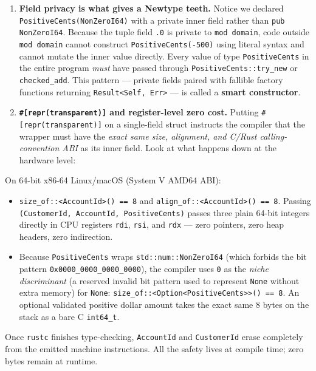 \begin{enumerate}
  \item \textbf{Field privacy is what gives a Newtype teeth.} Notice we declared \texttt{PositiveCents(\allowbreak{}NonZeroI64)} with a private inner field rather than \texttt{pub NonZeroI64}. Because the tuple field \texttt{.0} is private to \texttt{mod domain}, code outside \texttt{mod domain} cannot construct \texttt{PositiveCents(-500)} using literal syntax and cannot mutate the inner value directly. Every value of type \texttt{PositiveCents} in the entire program \emph{must} have passed through \texttt{PositiveCents::\allowbreak{}try\_new} or \texttt{checked\_add}. This pattern --- private fields paired with fallible factory functions returning \texttt{Result<Self, Err>} --- is called a \textbf{smart constructor}.
  \item \textbf{\texttt{\#[repr(transparent)]} and register-level zero cost.} Putting \texttt{\#[repr(transparent)]} on a single-field struct instructs the compiler that the wrapper must have the \emph{exact same size, alignment, and C/Rust calling-convention ABI} as its inner field. Look at what happens down at the hardware level:
\end{enumerate}

\begin{happeningbox}
On 64-bit x86-64 Linux/macOS (System V AMD64 ABI):
\begin{itemize}
  \item \texttt{size\_of::<AccountId>() == 8} and \texttt{align\_of::<AccountId>() == 8}. Passing \texttt{(CustomerId, AccountId, PositiveCents)} passes three plain 64-bit integers directly in CPU registers \texttt{rdi}, \texttt{rsi}, and \texttt{rdx} --- zero pointers, zero heap headers, zero indirection.
  \item Because \texttt{PositiveCents} wraps \texttt{std::num::NonZeroI64} (which forbids the bit pattern \texttt{0x0000\_0000\_0000\_0000}), the compiler uses \texttt{0} as the \emph{niche discriminant} (a reserved invalid bit pattern used to represent \texttt{None} without extra memory) for \texttt{None}: \texttt{size\_of::<Option<PositiveCents>>() == 8}. An optional validated positive dollar amount takes the exact same 8 bytes on the stack as a bare C \texttt{int64\_t}.
\end{itemize}
Once \texttt{rustc} finishes type-checking, \texttt{AccountId} and \texttt{CustomerId} erase completely from the emitted machine instructions. All the safety lives at compile time; zero bytes remain at runtime.
\end{happeningbox}

